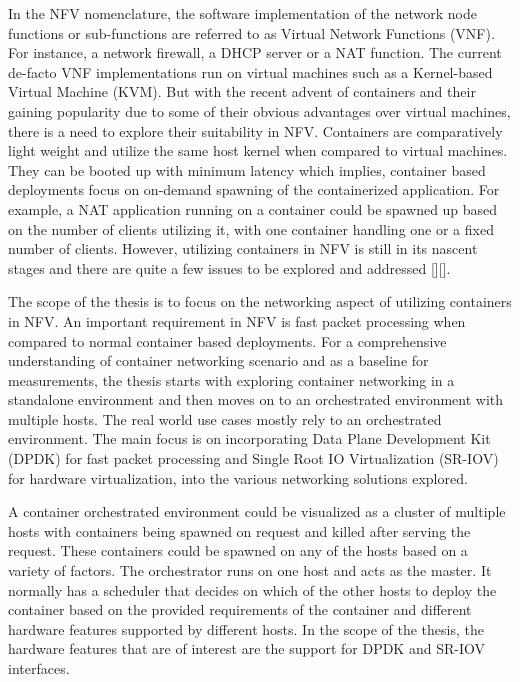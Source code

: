 \documentclass[english, 12pt, a4paper, elec, utf8, a-1b, online]{aaltothesis}
\begin{document}
In the NFV nomenclature, the software implementation of the network node functions or sub-functions are referred to as Virtual Network Functions (VNF). For instance, a network firewall, a DHCP server or a NAT function. The current de-facto VNF implementations run on virtual machines such as a Kernel-based Virtual Machine (KVM). But with the recent advent of containers and their gaining popularity due to some of their obvious advantages over virtual machines, there is a need to explore their suitability in NFV. Containers are comparatively light weight and utilize the same host kernel when compared to virtual machines. They can be booted up with minimum latency\cite{container-vm-comparison} which implies, container based deployments focus on on-demand spawning of the containerized application. For example, a NAT application running on a container could be spawned up based on the number of clients utilizing it, with one container handling one or a fixed number of clients. However, utilizing containers in NFV is still in its nascent stages and there are quite a few issues to be explored and addressed [][].

The scope of the thesis is to focus on the networking aspect of utilizing containers in NFV. An important requirement in NFV is fast packet processing when compared to normal container based deployments. For a comprehensive understanding of container networking scenario and as a baseline for measurements, the thesis starts with exploring container networking in a standalone environment and then moves on to an orchestrated environment with multiple hosts. The real world use cases mostly rely to an orchestrated environment. The main focus is on incorporating Data Plane Development Kit (DPDK) for fast packet processing and Single Root IO Virtualization (SR-IOV) for hardware virtualization, into the various networking solutions explored.

A container orchestrated environment could be visualized as a cluster of multiple hosts with containers being spawned on request and killed after serving the request. These containers could be spawned on any of the hosts based on a variety of factors. The orchestrator runs on one host and acts as the master. It normally has a scheduler that decides on which of the other hosts to deploy the container based on the provided requirements of the container and different hardware features supported by different hosts. In the scope of the thesis, the hardware features that are of interest are the support for DPDK and SR-IOV interfaces. 
\end{document}
